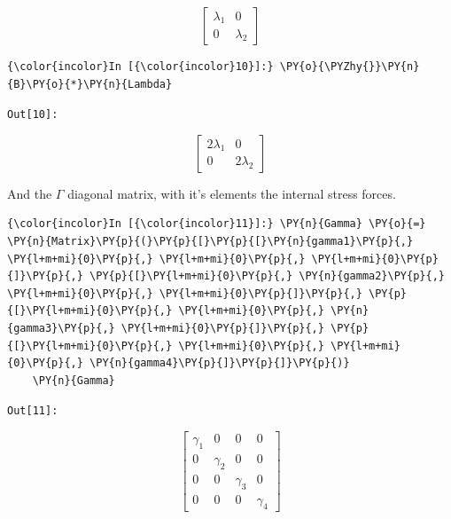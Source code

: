 \begin{equation*}
    \left[\begin{matrix}\lambda_{1} & 0\\0 & \lambda_{2}\end{matrix}\right]
\end{equation*}



\begin{Verbatim}[commandchars=\\\{\}]
    {\color{incolor}In [{\color{incolor}10}]:} \PY{o}{\PYZhy{}}\PY{n}{B}\PY{o}{*}\PY{n}{Lambda}
\end{Verbatim}
\texttt{\color{outcolor}Out[{\color{outcolor}10}]:}


\begin{equation*}
    \left[\begin{matrix}2 \lambda_{1} & 0\\0 & 2 \lambda_{2}\end{matrix}\right]
\end{equation*}



And the \(\Gamma\) diagonal matrix, with it's elements the internal
stress forces.

\begin{Verbatim}[commandchars=\\\{\}]
    {\color{incolor}In [{\color{incolor}11}]:} \PY{n}{Gamma} \PY{o}{=} \PY{n}{Matrix}\PY{p}{(}\PY{p}{[}\PY{p}{[}\PY{n}{gamma1}\PY{p}{,} \PY{l+m+mi}{0}\PY{p}{,} \PY{l+m+mi}{0}\PY{p}{,} \PY{l+m+mi}{0}\PY{p}{]}\PY{p}{,} \PY{p}{[}\PY{l+m+mi}{0}\PY{p}{,} \PY{n}{gamma2}\PY{p}{,} \PY{l+m+mi}{0}\PY{p}{,} \PY{l+m+mi}{0}\PY{p}{]}\PY{p}{,} \PY{p}{[}\PY{l+m+mi}{0}\PY{p}{,} \PY{l+m+mi}{0}\PY{p}{,} \PY{n}{gamma3}\PY{p}{,} \PY{l+m+mi}{0}\PY{p}{]}\PY{p}{,} \PY{p}{[}\PY{l+m+mi}{0}\PY{p}{,} \PY{l+m+mi}{0}\PY{p}{,} \PY{l+m+mi}{0}\PY{p}{,} \PY{n}{gamma4}\PY{p}{]}\PY{p}{]}\PY{p}{)}
    \PY{n}{Gamma}
\end{Verbatim}
\texttt{\color{outcolor}Out[{\color{outcolor}11}]:}


\begin{equation*}
    \left[\begin{matrix}\gamma_{1} & 0 & 0 & 0\\0 & \gamma_{2} & 0 & 0\\0 & 0 & \gamma_{3} & 0\\0 & 0 & 0 & \gamma_{4}\end{matrix}\right]
\end{equation*}



